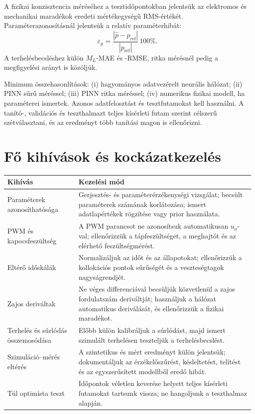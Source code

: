 \documentclass[11pt,a4paper]{article}
\begin{document}
A fizikai konzisztencia méréséhez a tesztidőpontokban jelentsük az elektromos és mechanikai maradékok eredeti mértékegységű RMS-értékét. Paraméterazonosításnál jelentsük a relatív paraméterhibát:
\[
  \varepsilon_p =
  \frac{|\hat{p}-p_{\mathrm{ref}}|}{|p_{\mathrm{ref}}|}\,100\%.
\]
A terhelésbecsléshez külön $M_L$-MAE és -RMSE, ritka mérésnél pedig a megfigyelési arányt is közöljük.

Minimum összehasonlítások: (i) hagyományos adatvezérelt neurális hálózat; (ii) PINN sűrű méréssel; (iii) PINN ritka méréssel; (iv) numerikus fizikai modell, ha paraméterei ismertek. Azonos adatfelosztást és tesztfutamokat kell használni. A tanító-, validációs és teszthalmazt teljes kísérleti futam szerint célszerű szétválasztani, és az eredményt több tanítási magon is ellenőrizni.

\section{Fő kihívások és kockázatkezelés}

\begin{longtable}{>{\raggedright\arraybackslash}p{} >{\raggedright\arraybackslash}p{}}
\toprule
Kihívás & Kezelési mód \\
\midrule
\endhead
Paraméterek azonosíthatósága & Gerjesztés- és paraméterérzékenységi vizsgálat; becsült paraméterek számának korlátozása; ismert adatlapértékek rögzítése vagy prior használata.\\
PWM és kapocsfeszültség & A PWM parancsot ne azonosítsuk automatikusan $u_a$-val; ellenőrizzük a tápfeszültséget, a meghajtót és az elérhető feszültségmérést.\\
Eltérő időskálák & Normalizáljuk az időt és az állapotokat; ellenőrizzük a kollokációs pontok sűrűségét és a veszteségtagok nagyságrendjét.\\
Zajos deriváltak & Ne véges differenciával becsüljük közvetlenül a zajos fordulatszám deriváltját; használjuk a hálózat automatikus deriválását, és ellenőrizzük a fizikai maradékot.\\
Terhelés és súrlódás összemosódása & Előbb külön kalibráljuk a súrlódást, majd ismert szimulált terhelésen teszteljük a terhelésbecslést.\\
Szimuláció--mérés eltérés & A szintetikus és mért eredményt külön jelentsük; dokumentáljuk az érzékelőszűrést, késleltetést, telítést és az egyszerűsített modellből eredő hibát.\\
Túl optimista teszt & Időpontok véletlen keverése helyett teljes kísérleti futamokat tartsunk vissza; ne hangoljunk a teszthalmaz alapján.\\
\bottomrule
\end{longtable}
\end{document}
